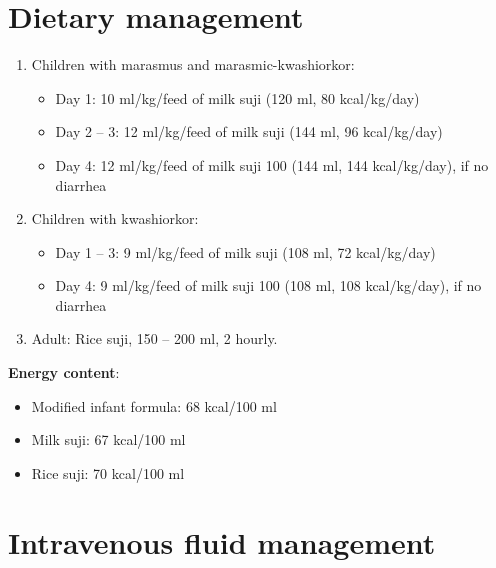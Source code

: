 \documentclass[11pt,a4paper]{report}
\begin{document}
\section{Dietary management} 

\begin{enumerate}
	\item Children with marasmus and marasmic-kwashiorkor:
	\begin{itemize}[noitemsep]
		\item Day 1: 10 ml/kg/feed of milk suji (120 ml, 80 kcal/kg/day)
		\item Day 2 -- 3: 12 ml/kg/feed of milk suji (144 ml, 96 kcal/kg/day)
		\item Day 4: 12 ml/kg/feed of milk suji 100 (144 ml, 144 kcal/kg/day), if no diarrhea
	\end{itemize}
	\item Children with kwashiorkor:
	\begin{itemize}[noitemsep]
		\item Day 1 -- 3: 9 ml/kg/feed of milk suji (108 ml, 72 kcal/kg/day)
		\item Day 4: 9 ml/kg/feed of milk suji 100 (108 ml, 108 kcal/kg/day), if no diarrhea
	\end{itemize}
	\item Adult: Rice suji, 150 -- 200 ml, 2 hourly.
\end{enumerate}

\noindent \textbf{Energy content}: 
\begin{itemize}[noitemsep]
	\item Modified infant formula: 68 kcal/100 ml
	\item Milk suji: 67 kcal/100 ml 
	\item Rice suji: 70 kcal/100 ml
\end{itemize}

\newpage
\section{Intravenous fluid management} 
\end{document}

